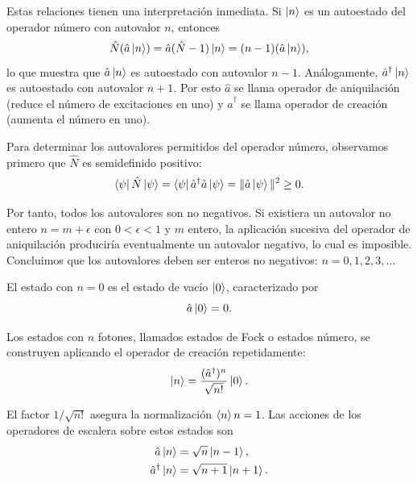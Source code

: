             Estas relaciones tienen una interpretación inmediata. Si $\ket{n}$ es un autoestado del operador número con autovalor $n$, entonces
            \begin{equation}
                \hat{N}(\hat{a}\ket{n}) = \hat{a}(\hat{N} - 1)\ket{n} = (n-1)(\hat{a}\ket{n}),
            \end{equation}
            lo que muestra que $\hat{a}\ket{n}$ es autoestado con autovalor $n-1$. Análogamente, $\hat{a}^\dagger\ket{n}$ es autoestado con autovalor $n+1$. Por esto $\hat{a}$ se llama operador de aniquilación (reduce el número de excitaciones en uno) y $\hat{a}^\dagger$ se llama operador de creación (aumenta el número en uno).

            Para determinar los autovalores permitidos del operador número, observamos primero que $\hat{N}$ es semidefinido positivo:
            \begin{equation}
                \bra{\psi}\hat{N}\ket{\psi} = \bra{\psi}\hat{a}^\dagger\hat{a}\ket{\psi} = \|\hat{a}\ket{\psi}\|^2 \geq 0.
            \end{equation}
            
            Por tanto, todos los autovalores son no negativos. Si existiera un autovalor no entero $n = m + \epsilon$ con $0 < \epsilon < 1$ y $m$ entero, la aplicación sucesiva del operador de aniquilación produciría eventualmente un autovalor negativo, lo cual es imposible. Concluimos que los autovalores deben ser enteros no negativos: $n = 0, 1, 2, 3, \ldots$
            
            El estado con $n = 0$ es el estado de vacío $\ket{0}$, caracterizado por
            \begin{equation}
                \hat{a}\ket{0} = 0.
            \end{equation}
            
            Los estados con $n$ fotones, llamados estados de Fock o estados número, se construyen aplicando el operador de creación repetidamente:
            \begin{equation}
                \ket{n} = \frac{(\hat{a}^\dagger)^n}{\sqrt{n!}}\ket{0}.
            \end{equation}
            
            El factor $1/\sqrt{n!}$ asegura la normalización $\braket{n}{n} = 1$. Las acciones de los operadores de escalera sobre estos estados son
            \begin{align}
                \hat{a}\ket{n} &= \sqrt{n}\ket{n-1}, \\
                \hat{a}^\dagger\ket{n} &= \sqrt{n+1}\ket{n+1}.
            \end{align}
            
